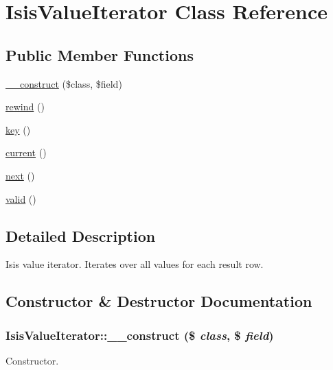 \hypertarget{classIsisValueIterator}{
\section{IsisValueIterator Class Reference}
\label{classIsisValueIterator}
}
\subsection*{Public Member Functions}
\begin{DoxyCompactItemize}
\item 
\hyperlink{classIsisValueIterator_a4b5811fff950f830cbba2da40dfac497}{\_\-\_\-construct} (\$class, \$field)
\item 
\hyperlink{classIsisValueIterator_a175fe47671b335eecc591598053a6a88}{rewind} ()
\item 
\hyperlink{classIsisValueIterator_a173b393699278fb2fb928e6bd2448a05}{key} ()
\item 
\hyperlink{classIsisValueIterator_ad7c6dd479b6129ba5bfc2f2003f6ca49}{current} ()
\item 
\hyperlink{classIsisValueIterator_adc2fb9b1dd029cab4be0b48d6e0f11f9}{next} ()
\item 
\hyperlink{classIsisValueIterator_a7f6b3e0941c2110f1b2ba10ba2b87fb8}{valid} ()
\end{DoxyCompactItemize}


\subsection{Detailed Description}
Isis value iterator. Iterates over all values for each result row. 

\subsection{Constructor \& Destructor Documentation}
\hypertarget{classIsisValueIterator_a4b5811fff950f830cbba2da40dfac497}{
\subsubsection[{\_\-\_\-construct}]{\setlength{\rightskip}{0pt plus 5cm}IsisValueIterator::\_\-\_\-construct (\$ {\em class}, \/  \$ {\em field})}}
\label{classIsisValueIterator_a4b5811fff950f830cbba2da40dfac497}
Constructor.


